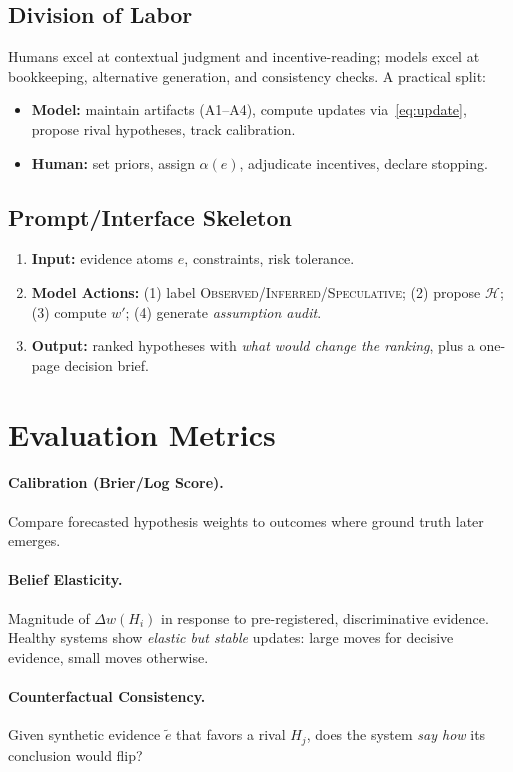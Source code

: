\documentclass[11pt]{article}
\newcommand{\Obs}{\textsc{Observed}}
\newcommand{\Inf}{\textsc{Inferred}}
\newcommand{\Spec}{\textsc{Speculative}}
\newcommand{\Hset}{\mathcal{H}}
\begin{document}
\subsection{Division of Labor}
Humans excel at contextual judgment and incentive-reading; models excel at bookkeeping, alternative generation, and consistency checks. A practical split:
\begin{itemize}
  \item \textbf{Model:} maintain artifacts (A1--A4), compute updates via~\eqref{eq:update}, propose rival hypotheses, track calibration.
  \item \textbf{Human:} set priors, assign $\alpha(e)$, adjudicate incentives, declare stopping.
\end{itemize}

\subsection{Prompt/Interface Skeleton}
\begin{enumerate}[label=\alph*)]
  \item \textbf{Input:} evidence atoms $e$, constraints, risk tolerance.
  \item \textbf{Model Actions:} (1) label \Obs/\Inf/\Spec; (2) propose $\Hset$; (3) compute $w'$; (4) generate \emph{assumption audit}.
  \item \textbf{Output:} ranked hypotheses with \emph{what would change the ranking}, plus a one-page decision brief.
\end{enumerate}

\section{Evaluation Metrics}
\paragraph{Calibration (Brier/Log Score).} Compare forecasted hypothesis weights to outcomes where ground truth later emerges.

\paragraph{Belief Elasticity.} Magnitude of $\Delta w(H_i)$ in response to pre-registered, discriminative evidence. Healthy systems show \emph{elastic but stable} updates: large moves for decisive evidence, small moves otherwise.

\paragraph{Counterfactual Consistency.} Given synthetic evidence $\tilde{e}$ that favors a rival $H_j$, does the system \emph{say how} its conclusion would flip?
\end{document}

